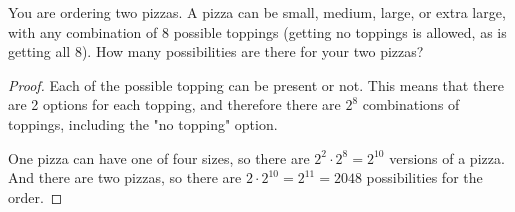 \begin{exercise}{14}
    You are ordering two pizzas. A pizza can be small, medium, large, or extra large, with
any combination of 8 possible toppings (getting no toppings is allowed, as is getting all
8). How many possibilities are there for your two pizzas?
\end{exercise}

\begin{proof}
    Each of the possible topping can be present or not. This means that there are 2 options for each topping, and therefore
    there are $2^8$ combinations of toppings, including the "no topping" option.

    One pizza can have one of four sizes, so there are $2^2 \cdot 2^8 = 2^{10}$ versions of a pizza. And there are two pizzas, so there are $2 \cdot 2^{10} = 2^{11} = 2048$ possibilities for the order.
\end{proof}

